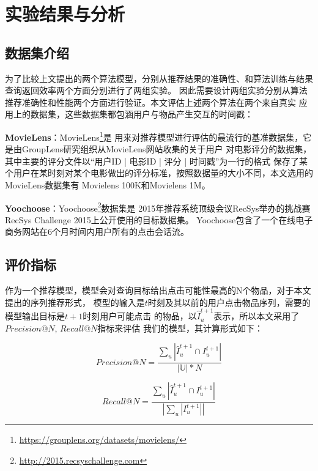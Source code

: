 ﻿%
\chapter{实验结果与分析}

\section{数据集介绍}

为了比较上文提出的两个算法模型，分别从推荐结果的准确性、和算法训练与结果查询返回效率两个方面分别进行了两组实验。%
因此需要设计两组实验分别从算法推荐准确性和性能两个方面进行验证。本文评估上述两个算法在两个来自真实%
应用上的数据集，这些数据集都包涵用户与物品产生交互的时间戳：

\textbf{MovieLens}：MovieLens\footnote{\url{https://grouplens.org/datasets/movielens/}}是%
用来对推荐模型进行评估的最流行的基准数据集，它是由GroupLens研究组织从MovieLens网站收集的关于用户%
对电影评分的数据集，其中主要的评分文件以“用户ID | 电影ID | 评分 | 时间戳”为一行的格式%
保存了某个用户在某时刻对某个电影做出的评分标准，按照数据量的大小不同，本文选用的MovieLens数据集有%
Movielens 100K和Movielens 1M。

\textbf{Yoochoose}：Yoochoose\footnote{\url{http://2015.recsyschallenge.com}}数据集是%
2015年推荐系统顶级会议RecSys举办的挑战赛RecSys Challenge 2015上公开使用的目标数据集。%
Yoochoose包含了一个在线电子商务网站在6个月时间内用户所有的点击会话流。%





\section{评价指标}
作为一个推荐模型，模型会对查询目标给出点击可能性最高的N个物品，对于本文提出的序列推荐形式，%
模型的输入是$t$时刻及其以前的用户点击物品序列，需要的模型输出目标是$t+1$时刻用户可能点击%
的物品，以$\hat{I}_{u}^{t+1}$表示，所以本文采用了$Precision@N$, $Recall@N$指标来评估%
我们的模型，其计算形式如下：

\begin{equation}
Precision@N=\frac{\sum_{u}|\hat{I}_{u}^{t+1}\cap I_{u}^{t+1} |}{\left | \mathbb{U} \right |*N}
\end{equation}

\begin{equation}
Recall@N=\frac{\sum_{u}|\hat{I}_{u}^{t+1}\cap I_{u}^{t+1} |}{\left |\sum_{u}|I_{u}^{t+1}| \right |}
\end{equation}

